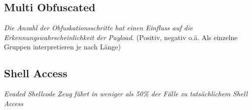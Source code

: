 \subsection{Multi Obfuscated}
\textit{Die Anzahl der Obfuskationsschritte hat einen Einfluss auf die Erkennungswahrscheinlichkeit der Payload.} (Positiv, negativ o.ä. Als einzelne Gruppen interpretieren je nach Länge)
\subsection{Shell Access}
\textit{Evaded Shellcode Zeug führt in weniger als 50\% der Fälle zu tatsächlichem Shell Access}